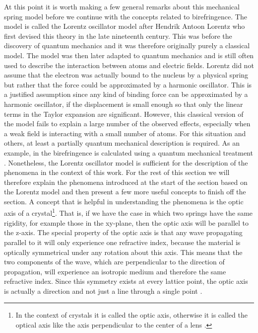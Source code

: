 At this point it is worth making a few general remarks about this mechanical spring model before we continue with the concepts related to birefringence. The model is called the Lorentz oscillator model after Hendrik Antoon Lorentz who first devised this theory in the late nineteenth century. This was before the discovery of quantum mechanics and it was therefore originally purely a classical model. The model was then later adapted to quantum mechanics and is still often used to describe the interaction between atoms and electric fields. Lorentz did not assume that the electron was actually bound to the nucleus by a physical spring but rather that the force could be approximated by a harmonic oscillator. This is a justified assumption since any kind of binding force can be approximated by a harmonic oscillator, if the displacement is small enough so that only the linear terms in the Taylor expansion are significant. However, this classical version of the model fails to explain a large number of the observed effects, especially when a weak field is interacting with a small number of atoms. For this situation and others, at least a partially quantum mechanical description is required. As an example, in \cite{Rerat2020} the birefringence is calculated using a quantum mechanical treatment \cite{doi:https://doi.org/10.1002/9780470409718.ch3}. Nonetheless, the Lorentz oscillator model is sufficient for the description of the phenomena in the context of this work. For the rest of this section we will therefore explain the phenomena introduced at the start of the section based on the Lorentz model and then present a few more useful concepts to finish off the section. A concept that is helpful in understanding the phenomena is the optic axis of a crystal\footnote{In the context of crystals it is called the optic axis, otherwise it is called the optical axis like the axis perpendicular to the center of a lens \cite{Hecht}.}. That is, if we have the case in which two springs have the same rigidity, for example those in the xy-plane, then the optic axis will be parallel to the z-axis. The special property of the optic axis is that any wave propagating parallel to it will only experience one refractive index, because the material is optically symmetrical under any rotation about this axis. This means that the two components of the wave, which are perpendicular to the direction of propagation, will experience an isotropic medium and therefore the same refractive index. Since this symmetry exists at every lattice point, the optic axis is actually a direction and not just a line through a single point \cite{Hecht}. 

